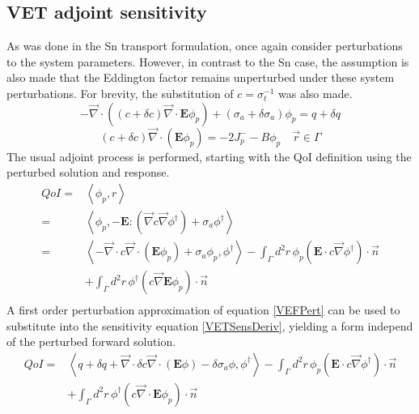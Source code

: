\documentclass{article}
\newcommand{\vr}{\vec{r}}
\newcommand{\bra}{\left\langle}
\newcommand{\ket}{\right\rangle}
\newcommand{\vdiv}{\vec{\nabla} \cdot}
\newcommand{\vgrad}{\vec{\nabla}}
\newcommand{\Edd}{\mathbf{E}}
\newcommand{\sigt}{\sigma_t}
\newcommand{\siga}{\sigma_a}
\newcommand{\isigt}{c}
\newcommand{\scalSource}{q}
\newcommand{\scalResp}{r}
\newcommand{\qoi}{QoI}
\begin{document}
\subsection{VET adjoint sensitivity}

As was done in the Sn transport formulation, once again consider perturbations to the system parameters. However, in contrast to the Sn case, the assumption is also made that the Eddington factor remains unperturbed under these system perturbations. For brevity, the substitution of $\isigt = \sigt^{-1}$ was also made.
\begin{equation}
\label{VEFPert}
- \vdiv \left((\isigt + \delta \isigt)\vdiv \Edd \phi_p \right) + (\siga + \delta \siga)\phi_p = \scalSource + \delta \scalSource
\end{equation}
\begin{equation}
(\isigt + \delta \isigt) \vec{\nabla} \cdot \left(\Edd \phi_p \right)  = - 2J_p^- - B \phi_p \quad \vr \in \Gamma
\end{equation}
The usual adjoint process is performed, starting with the QoI definition using the perturbed solution and response. 
\begin{equation}
\label{VETSensDeriv}
\begin{split}
\qoi=&\bra \phi_p , \scalResp \ket \\
=&\bra \phi_p , - \Edd : \left( \vgrad \isigt \vgrad \phi^\dag \right) + \siga \phi^\dag \ket \\
=& \bra - \vdiv \isigt \vdiv \left( \Edd \phi_p \right) + \siga \phi_p, \phi^\dag \ket 
- \int_\Gamma d^2 r \, \phi_p \left( \Edd \cdot \isigt \vgrad \phi^\dag \right) \cdot \vec{n}  \\ 
&+ \int_\Gamma d^2 r \, \phi^\dag \left(  \isigt \vgrad \Edd \phi_p \right) \cdot \vec{n} \\
\end{split}
\end{equation}
A first order perturbation approximation of equation \ref{VEFPert} can be used to substitute into the sensitivity equation \ref{VETSensDeriv}, yielding a form independ of the perturbed forward solution.
\begin{equation}
\label{QoIVETAdjNoBC}
\begin{split}
\qoi =& \bra \scalSource + \delta \scalSource + \vdiv \delta \isigt \vdiv \left( \Edd \phi \right) - \delta \siga \phi, \phi^\dag \ket - \int_\Gamma d^2 r \, \phi_p \left( \Edd \cdot \isigt \vgrad \phi^\dag \right) \cdot \vec{n} 
\\ &+ \int_\Gamma d^2 r \, \phi^\dag \left(  \isigt \vdiv \Edd \phi_p \right) \cdot \vec{n} 
\end{split}
\end{equation}
\end{document}
